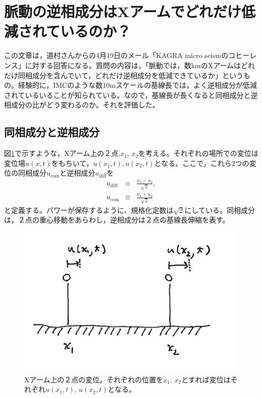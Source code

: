 \section{脈動の逆相成分はXアームでどれだけ低減されているのか？}
この文章は，道村さんからの4月19日のメール「KAGRA micro seismのコヒーレンス」に対する回答になる。質問の内容は，「脈動では，数kmのXアームはどれだけ同相成分を含んでいて，どれだけ逆相成分を低減できているか」というもの。経験的に，IMCのような数10mスケールの基線長では，よく逆相成分が低減されているいることが知られている。なので，基線長が長くなると同相成分と逆相成分の比がどう変わるのか。それを評価した。


\subsection{同相成分と逆相成分}
図\ref{img:img_diffcomm}で示すような，Xアーム上の２点,$x_1,\,x_2$を考える。それぞれの場所での変位は変位場$u(x,t)$をもちいて，$u(x_1,t),u(x_2,t)$となる。ここで，これら2つの変位の同相成分$u_{\mathrm{com}}$と逆相成分$u_\mathrm{diff}$を
\begin{eqnarray}\label{eq:eq22}
  u_{\mathrm{diff}} &\equiv& \frac{u_{1}-u_{2}}{\sqrt{2}}, \\
  u_{\mathrm{com}}  &\equiv& \frac{u_{1}+u_{2}}{\sqrt{2}}
\end{eqnarray}
と定義する。パワーが保存するように、規格化定数は$\sqrt{2}$にしている。同相成分は，２点の重心移動をあらわし，逆相成分は２点の基線長伸縮を表す。


\begin{figure}[H]
  \begin{center}
    \includegraphics[width=11.5cm]{./cdmr/xarm.png}
  \end{center}
  \caption{Xアーム上の２点の変位。それぞれの位置を$x_1,\,x_2$とすれば変位はそれぞれ$u(x_1,t),\,u(x_2,t)$となる。}\label{img:img_diffcomm}
\end{figure}


